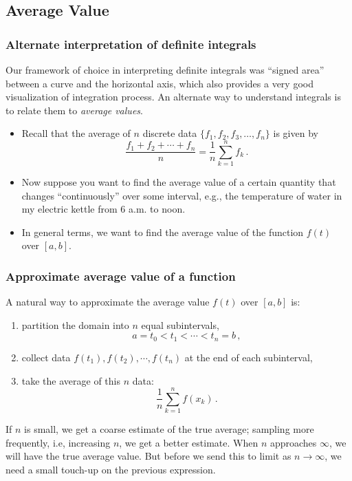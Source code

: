 \documentclass[10pt,t,handout,ignorenonframetext,aspectratio=169]{beamer}
\begin{document}
\subsection{Average Value}

\begin{frame}
  \frametitle{Alternate interpretation of definite integrals}
  Our framework of choice in interpreting definite integrals was
  {``signed area''} between a curve and the horizontal axis, which
  also provides a very good visualization of integration process.  An
  alternate way to understand integrals is to relate them to
  \textit{average values}.

  \begin{itemize}
  \item Recall that the average of $n$ discrete data
    $\{f_1, f_2, f_3, \ldots, f_n\}$ is given by
    \[
      \frac{f_1 + f_2 + \cdots + f_n}{n} = \frac{1}{n} \sum_{k=1}^n f_k \,.
      \tag{average; discrete}
    \]
  \item Now suppose you want to find the average value of a certain quantity
    that changes {``continuously''} over some interval, e.g., the
    temperature of water in my electric kettle from 6 a.m. to noon.
  \item In general terms, we want to find the average value of the function
    $f(t)$ over $[a,b]$.
  \end{itemize}
\end{frame}

\begin{frame}
  \frametitle{Approximate average value of a function}
  A natural way to approximate the average value $f(t)$ over $[a,b]$
  is:
  \begin{enumerate}
  \item partition the domain into $n$ equal subintervals,
    \[
      a = t_0 < t_1 < \cdots < t_n = b \,,
    \]
  \item collect data $f(t_1), f(t_2), \cdots, f(t_n)$ at the end of
    each subinterval,
  \item take the average of this $n$ data:
    \[
      \frac{1}{n} \sum_{k=1}^n f(x_k) \,.
    \]
  \end{enumerate}

  If $n$ is small, we get a coarse estimate of the true average;
  sampling more frequently, i.e, increasing $n$, we get a better
  estimate. When $n$ approaches $\infty$, we will have the true
  average value. But before we send this to limit as $n \to \infty$,
  we need a small touch-up on the previous expression.

\end{frame}
\end{document}

